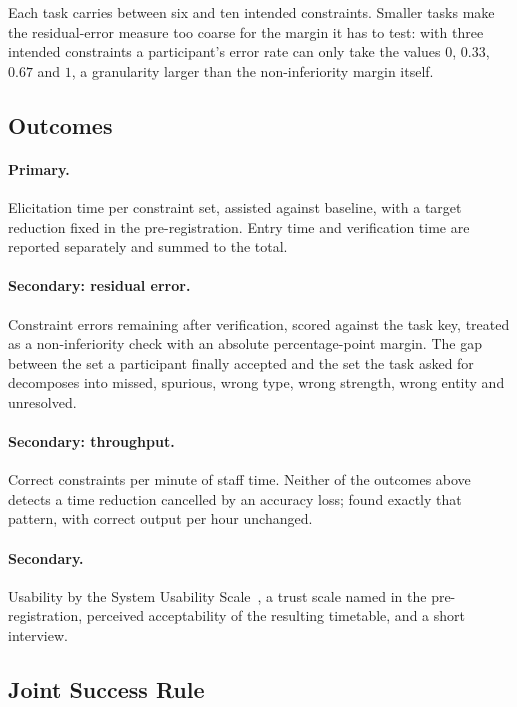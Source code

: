 \documentclass[acmsmall,screen,review,anonymous]{acmart}
\begin{document}
Each task carries between six and ten intended constraints. Smaller tasks make
the residual-error measure too coarse for the margin it has to test: with
three intended constraints a participant's error rate can only take the values
$0$, $0.33$, $0.67$ and $1$, a granularity larger than the non-inferiority
margin itself.

\subsection{Outcomes}

\paragraph{Primary.} Elicitation time per constraint set, assisted against
baseline, with a target reduction fixed in the pre-registration. Entry time
and verification time are reported separately and summed to the total.

\paragraph{Secondary: residual error.} Constraint errors remaining after
verification, scored against the task key, treated as a non-inferiority check
with an absolute percentage-point margin. The gap between the set a
participant finally accepted and the set the task asked for decomposes into
missed, spurious, wrong type, wrong strength, wrong entity and unresolved.

\paragraph{Secondary: throughput.} Correct constraints per minute of staff
time. Neither of the outcomes above detects a time reduction cancelled by an
accuracy loss; \cite{ipeirotis2026nlidb} found exactly that pattern, with
correct output per hour unchanged.

\paragraph{Secondary.} Usability by the System Usability
Scale~\cite{brooke1996sus}, a trust scale named in the pre-registration,
perceived acceptability of the resulting timetable, and a short interview.

\subsection{Joint Success Rule}
\end{document}
